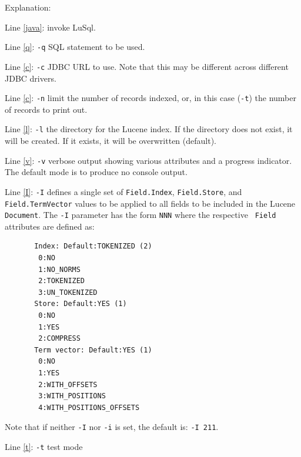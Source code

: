 Explanation:
\begin{mlist}
  \item Line \ref{java}: invoke LuSql.
  \item Line \ref{q}: {\tt -q} SQL statement to be used.
  \item Line \ref{c}: {\tt -c} JDBC URL to use.
    Note that this may be different across different JDBC drivers.
  \item Line \ref{c}: {\tt -n} limit the number of records indexed, or, in
    this case ({\tt -t}) the number of records to print out.
  \item Line \ref{l}: {\tt -l} the directory for the Lucene index.
    If the directory does not exist, it will be created.
    If it exists, it will be overwritten (default).
  \item Line \ref{v}: {\tt -v} verbose output showing various attributes and
    a progress indicator.
    The default mode is to produce no console output.
  \item Line \ref{I}: {\tt -I} defines a single set of
    {\tt Field.Index}, {\tt Field.Store}, and {\tt Field.TermVector} values to
    be applied to all fields to be included in the Lucene {\tt Document}. 
    The {\tt -I} parameter has the form {\tt NNN} where the respective {\tt
      Field} attributes are defined as:\label{nnn}
{\small
\begin{verbatim}
       Index: Default:TOKENIZED (2)
        0:NO
        1:NO_NORMS
        2:TOKENIZED
        3:UN_TOKENIZED
       Store: Default:YES (1)
        0:NO
        1:YES
        2:COMPRESS
       Term vector: Default:YES (1)
        0:NO
        1:YES
        2:WITH_OFFSETS
        3:WITH_POSITIONS
        4:WITH_POSITIONS_OFFSETS
\end{verbatim}
}

Note that if neither {\tt -I} nor {\tt -i} is set, the default is: {\tt -I
  211}.  
  \item Line \ref{t}: {\tt -t} test mode
\end{mlist}

